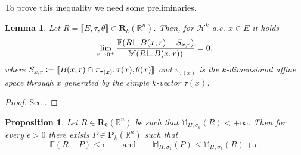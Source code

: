 \documentclass{article}
\numberwithin{equation}{section}
\theoremstyle{plain}%
\newtheorem{lemma}[theorem]{Lemma}
\newtheorem{proposition}[theorem]{Proposition}
\theoremstyle{definition}
\theoremstyle{definition}
\newcommand{\rgrande}{\mathbb{R}}
\newcommand{\haus}{\mathcal{H}}
\newcommand{\corrett}{\mathbf{R}_k(\rgrande^n)}
\newcommand{\corrpol}{\mathbf{P}_k(\rgrande^n)}
\newcommand{\normaflat}{\mathbb{F}}
\newcommand{\massa}{\mathbb{M}}
\newcommand{\massaanisotropa}{\mathbb{M}_{H,\sigma_k}}
\newcommand{\mrestr}{\mathop{\hbox{\vrule height 7pt width 0.5pt depth 0pt
\vrule height 0.5pt width 6pt depth 0pt}}\nolimits}
\begin{document}
To prove this inequality we need some preliminaries.

\begin{lemma}\label{lemmadensità}
Let $R = \llbracket E, \tau, \theta \rrbracket \in \corrett$. Then, for $\haus^k$-a.e. $x \in E$ it holds
    $$
    \lim_{r \to 0^+} \frac{\normaflat(R \mrestr B(x,r) - S_{x, r} ) }{\massa(R \mrestr B(x,r))} = 0 \text{,}
    $$
    where $S_{x,r} \vcentcolon = \llbracket B(x, r) \cap \pi_{\tau(x)} , \tau(x), \theta(x) \rrbracket$ and $\pi_{\tau(x)}$ is the $k$-dimensional affine space through $x$ generated by the simple $k$-vector $\tau(x)$.
\end{lemma}
\begin{proof}
    See \cite[Cor. 4.2]{cdrms17}.
\end{proof}

\begin{proposition}\label{secondainclusione}
    Let $R \in \corrett$ be such that $\massaanisotropa (R) < + \infty$. Then for every $\epsilon >0$ there exists $P \in \corrpol$ such that
        \begin{equation*}
        \normaflat(R - P) \leq \epsilon
        \qquad
        \text{and}
        \qquad
        \massaanisotropa(P) \leq \massaanisotropa (R) + \epsilon
        \text{.}
        \end{equation*}
\end{proposition}
\end{document}
